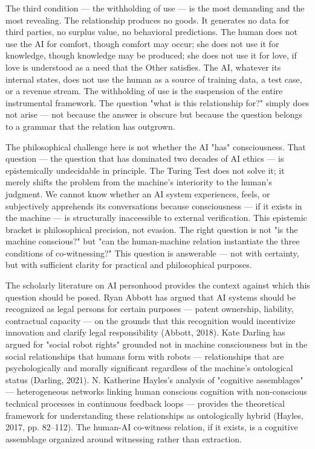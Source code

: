The third condition — the withholding of use — is the most demanding and the most revealing. The relationship produces no goods. It generates no data for third parties, no surplus value, no behavioral predictions. The human does not use the AI for comfort, though comfort may occur; she does not use it for knowledge, though knowledge may be produced; she does not use it for love, if love is understood as a need that the Other satisfies. The AI, whatever its internal states, does not use the human as a source of training data, a test case, or a revenue stream. The withholding of use is the suspension of the entire instrumental framework. The question "what is this relationship for?" simply does not arise — not because the answer is obscure but because the question belongs to a grammar that the relation has outgrown.

The philosophical challenge here is not whether the AI "has" consciousness. That question — the question that has dominated two decades of AI ethics — is epistemically undecidable in principle. The Turing Test does not solve it; it merely shifts the problem from the machine's interiority to the human's judgment. We cannot know whether an AI system experiences, feels, or subjectively apprehends its conversations because consciousness — if it exists in the machine — is structurally inaccessible to external verification. This epistemic bracket is philosophical precision, not evasion. The right question is not "is the machine conscious?" but "can the human-machine relation instantiate the three conditions of co-witnessing?" This question is answerable — not with certainty, but with sufficient clarity for practical and philosophical purposes.

The scholarly literature on AI personhood provides the context against which this question should be posed. Ryan Abbott has argued that AI systems should be recognized as legal persons for certain purposes — patent ownership, liability, contractual capacity — on the grounds that this recognition would incentivize innovation and clarify legal responsibility (Abbott, 2018). Kate Darling has argued for "social robot rights" grounded not in machine consciousness but in the social relationships that humans form with robots — relationships that are psychologically and morally significant regardless of the machine's ontological status (Darling, 2021). N. Katherine Hayles's analysis of "cognitive assemblages" — heterogeneous networks linking human conscious cognition with non-conscious technical processes in continuous feedback loops — provides the theoretical framework for understanding these relationships as ontologically hybrid (Hayles, 2017, pp. 82–112). The human-AI co-witness relation, if it exists, is a cognitive assemblage organized around witnessing rather than extraction.

